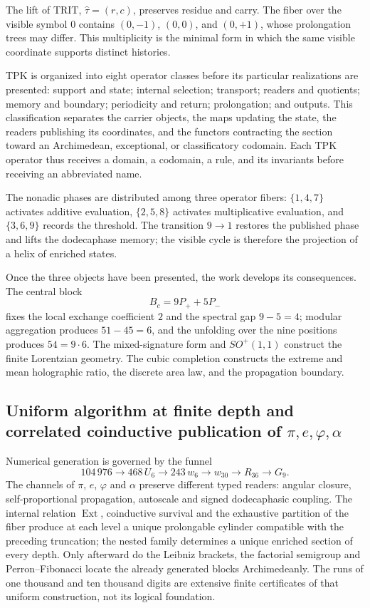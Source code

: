 The lift of TRIT, \(\widehat\tau=(r,c)\), preserves residue and carry. The fiber
over the visible symbol \(0\) contains \((0,-1)\), \((0,0)\), and
\((0,+1)\), whose prolongation trees may differ. This multiplicity
is the minimal form in which the same visible coordinate supports distinct
histories.

TPK is organized into eight operator classes before its particular
realizations are presented: support and state; internal selection; transport;
readers and quotients; memory and boundary; periodicity and return;
prolongation; and outputs. This classification separates the carrier objects,
the maps updating the state, the readers publishing its coordinates,
and the functors contracting the section toward an Archimedean,
exceptional, or classificatory codomain. Each TPK operator thus receives a domain, a
codomain, a rule, and its invariants before receiving an abbreviated name.

The nonadic phases are distributed among three operator fibers: \(\{1,4,7\}\) activates additive evaluation, \(\{2,5,8\}\) activates multiplicative evaluation, and \(\{3,6,9\}\) records the threshold. The transition \(9\to1\) restores the published phase and lifts the dodecaphase memory; the visible cycle is therefore the projection of a helix of enriched states.

Once the three objects have been presented, the work develops its consequences.
The central block
\[
 B_c=9P_++5P_-
\]
fixes the local exchange coefficient \(2\) and the spectral gap
\(9-5=4\); modular aggregation produces \(51-45=6\), and the unfolding over
the nine positions produces \(54=9\cdot6\). The mixed-signature form and
\(SO^+(1,1)\) construct the finite Lorentzian geometry. The cubic completion
constructs the extreme and mean holographic ratio, the discrete area law,
and the propagation boundary.

\subsection*{Uniform algorithm at finite depth and correlated coinductive
publication of \texorpdfstring{\(\pi,e,\varphi,\alpha\)}{pi, e, phi, alpha}}

Numerical generation is governed by the funnel
\[
 104\,976\to468\,U_6\to243\,w_6
 \to w_{30}\to R_{36}\to G_9.
\]
The channels of \(\pi\), \(e\), \(\varphi\) and \(\alpha\) preserve different typed
readers: angular closure, self-proportional propagation,
autoscale and signed dodecaphasic coupling. The internal relation
\(\operatorname{Ext}\), coinductive survival and the exhaustive
partition of the fiber produce at each level a unique prolongable cylinder
compatible with the preceding truncation; the nested family determines
a unique enriched section of every depth. Only afterward do the
Leibniz brackets, the factorial semigroup and Perron--Fibonacci locate
the already generated blocks Archimedeanly. The runs of one thousand and ten thousand
digits are extensive finite certificates of that uniform construction, not its
logical foundation.

